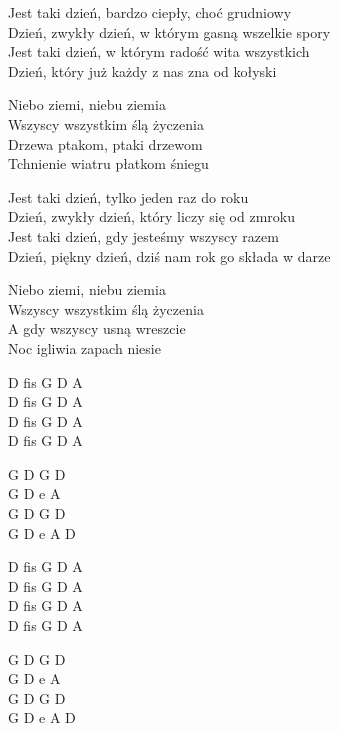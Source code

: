 \begin{text}
    Jest taki dzień, bardzo ciepły, choć grudniowy\\
    Dzień, zwykły dzień, w którym gasną wszelkie spory\\
    Jest taki dzień, w którym radość wita wszystkich\\
    Dzień, który już każdy z nas zna od kołyski

    \vin Niebo ziemi, niebu ziemia\\
    \vin Wszyscy wszystkim ślą życzenia\\
    \vin Drzewa ptakom, ptaki drzewom\\
    \vin Tchnienie wiatru płatkom śniegu

    Jest taki dzień, tylko jeden raz do roku\\
    Dzień, zwykły dzień, który liczy się od zmroku\\
    Jest taki dzień, gdy jesteśmy wszyscy razem\\
    Dzień, piękny dzień, dziś nam rok go składa w darze

    \vin Niebo ziemi, niebu ziemia\\
    \vin Wszyscy wszystkim ślą życzenia\\
    \vin A gdy wszyscy usną wreszcie\\
    \vin Noc igliwia zapach niesie 
\end{text}
\begin{chord}
    D fis G D A\\
	D fis G D A\\
	D fis G D A\\
	D fis G D A
	
	G D G D\\
	G D e A\\
	G D G D\\
	G D e A D
	
	D fis G D A\\
	D fis G D A\\
	D fis G D A\\
	D fis G D A
	
	G D G D\\
	G D e A\\
	G D G D\\
	G D e A D
\end{chord}